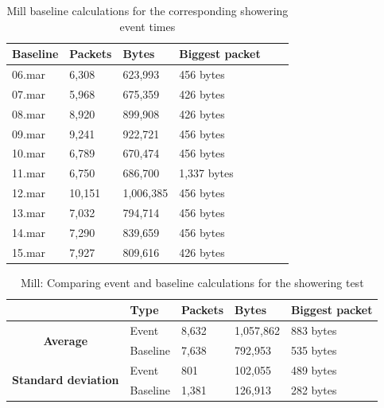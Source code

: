\begin{table}[H]
    \centering
    \caption{Mill baseline calculations for the corresponding showering event times}
    \begin{tabular}{|l|l|l|l|l|l|}
    \hline
        \textbf{Baseline} & \textbf{Packets} & \textbf{Bytes} & \textbf{Biggest packet} \\ \hline
        06.mar & 6,308  & 623,993   & 456 bytes \\ \hline
        07.mar & 5,968  & 675,359   & 426 bytes \\ \hline
        08.mar & 8,920  & 899,908   & 426 bytes \\ \hline
        09.mar & 9,241  & 922,721   & 456 bytes \\ \hline
        10.mar & 6,789  & 670,474   & 456 bytes \\ \hline
        11.mar & 6,750  & 686,700   & 1,337 bytes \\ \hline
        12.mar & 10,151 & 1,006,385 & 456 bytes \\ \hline
        13.mar & 7,032  & 794,714   & 456 bytes \\ \hline
        14.mar & 7,290  & 839,659   & 456 bytes \\ \hline
        15.mar & 7,927  & 809,616   & 426 bytes \\ \hline
    \end{tabular}
    \label{tab:MillBaselineShowerCalculations}
\end{table}

\begin{table}[H]
    \centering
    \caption{Mill: Comparing event and baseline calculations for the showering test}
    \begin{tabular}{c|l|l|l|l|}
        \cline{2-5}
        \multicolumn{1}{l|}{}                                              & \textbf{Type} & \textbf{Packets} & \textbf{Bytes} & \textbf{Biggest packet} \\ \hline
        \multicolumn{1}{|c|}{\multirow{2}{*}{\textbf{Average}}}            & Event         & 8,632            & 1,057,862       & 883 bytes               \\ \cline{2-5} 
        \multicolumn{1}{|c|}{}                                             & Baseline      & 7,638            & 792,953         & 535 bytes                \\ \hline
        \multicolumn{1}{|c|}{\multirow{2}{*}{\textbf{Standard deviation}}} & Event         & 801              & 102,055         & 489 bytes                 \\ \cline{2-5} 
        \multicolumn{1}{|c|}{}                                             & Baseline      & 1,381            & 126,913       
          &  282 bytes               \\ \hline          
    \end{tabular}
    \label{tab:MillComparingBaselineAndShowerCalculations}
\end{table}

